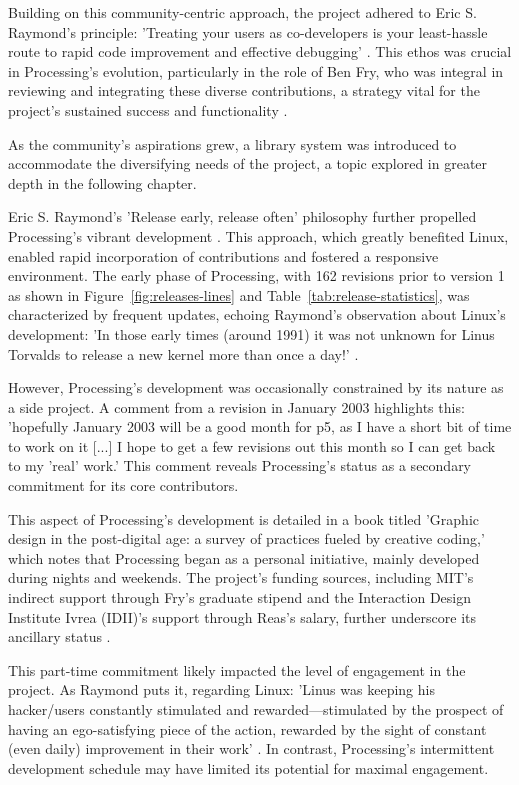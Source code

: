 Building on this community-centric approach, the project adhered to Eric S. Raymond's principle: 'Treating your users as co-developers is your least-hassle route to rapid code improvement and effective debugging' \parencite[27]{raymondCathedralBazaar1999}. This ethos was crucial in Processing's evolution, particularly in the role of Ben Fry, who was integral in reviewing and integrating these diverse contributions, a strategy vital for the project's sustained success and functionality \parencite{Processing4CONTRIBUTINGMd}.

As the community's aspirations grew, a library system was introduced to accommodate the diversifying needs of the project, a topic explored in greater depth in the following chapter.

Eric S. Raymond's 'Release early, release often' philosophy further propelled Processing's vibrant development \parencite[28]{raymondCathedralBazaar1999}. This approach, which greatly benefited Linux, enabled rapid incorporation of contributions and fostered a responsive environment. The early phase of Processing, with 162 revisions prior to version 1 as shown in Figure~\ref{fig:releases-lines} and Table~\ref{tab:release-statistics}, was characterized by frequent updates, echoing Raymond's observation about Linux's development: 'In those early times (around 1991) it was not unknown for Linus Torvalds to release a new kernel more than once a day!' \parencite[28]{raymondCathedralBazaar1999}.

However, Processing's development was occasionally constrained by its nature as a side project. A comment from a revision in January 2003 highlights this: 'hopefully January 2003 will be a good month for p5, as I have a short bit of time to work on it [...] I hope to get a few revisions out this month so I can get back to my 'real' work.' This comment reveals Processing's status as a secondary commitment for its core contributors.

This aspect of Processing's development is detailed in a book titled 'Graphic design in the post-digital age: a survey of practices fueled by creative coding,' which notes that Processing began as a personal initiative, mainly developed during nights and weekends. The project's funding sources, including MIT's indirect support through Fry's graduate stipend and the Interaction Design Institute Ivrea (IDII)'s support through Reas's salary, further underscore its ancillary status \parencite[396]{conradGraphicDesignPostdigital2021}.

This part-time commitment likely impacted the level of engagement in the project. As Raymond puts it, regarding Linux: 'Linus was keeping his hacker/users constantly stimulated and rewarded—stimulated by the prospect of having an ego-satisfying piece of the action, rewarded by the sight of constant (even daily) improvement in their work' \parencite[28]{raymondCathedralBazaar1999}. In contrast, Processing's intermittent development schedule may have limited its potential for maximal engagement.

